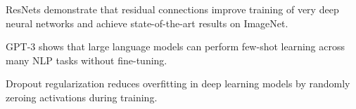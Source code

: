 \documentclass{article}
\begin{document}
ResNets \cite{he2016deep} demonstrate that residual connections improve training of very
deep neural networks and achieve state-of-the-art results on ImageNet.

GPT-3 \cite{brown2020language} shows that large language models can perform few-shot
learning across many NLP tasks without fine-tuning.

Dropout regularization reduces overfitting in deep learning models by randomly
zeroing activations during training.
\end{document}
